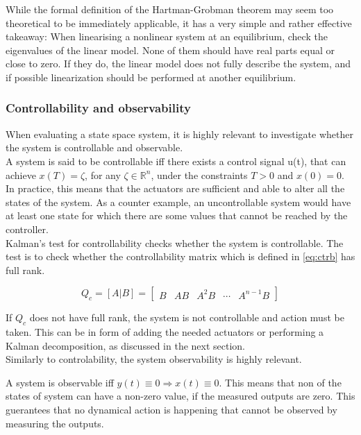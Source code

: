 While the formal definition of the Hartman-Grobman theorem may seem too theoretical to be immediately applicable, it has a very simple and rather effective takeaway: When linearising a nonlinear system at an equilibrium, check the eigenvalues of the linear model. None of them should have real parts equal or close to zero. If they do, the linear model does not fully describe the system, and if possible linearization should be performed at another equilibrium.

\subsubsection{Controllability and observability}
When evaluating a state space system, it is highly relevant to investigate whether the system is controllable and observable. \\
A system is said to be controllable iff there exists a control signal u(t), that can achieve $x(T) = \zeta$, for any $\zeta \in \mathbb{R} ^{n}$, under the constraints $T>0$ and $x(0)=0$. In practice, this means that the actuators are sufficient and able to alter all the states of the system. As a counter example, an uncontrollable system would have at least one state for which there are some values that cannot be reached by the controller.\\
Kalman's test for controllability checks whether the system is controllable. The test is to check whether the controllability matrix which is defined in \cref{eq:ctrb} has full rank.

\begin{equation} \label{eq:ctrb}
	Q_c = [A|B] = \begin{bmatrix}  B & AB & A^2B & \cdots & A^{n-1}B  \end{bmatrix}
\end{equation}

If $Q_c$ does not have full rank, the system is not controllable and action must be taken. This can be in form of adding the needed actuators or performing a Kalman decomposition, as discussed in the next section.\\

Similarly to controlability, the system observability is highly relevant.

\noindent A system is observable iff $y(t) \equiv 0 \Rightarrow x(t) \equiv 0$. This means that non of the states of system can have a non-zero value, if the measured outputs are zero. This guerantees that no dynamical action is happening that cannot be observed by measuring the outputs.\\


